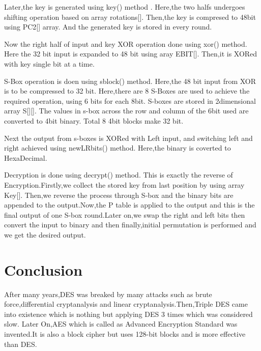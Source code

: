 \documentclass[11pt]{article}
\begin{document}
Later,the key is generated using key() method .
Here,the two halfs undergoes shifting operation based on array rotations[].
Then,the key is compresed to 48bit using PC2[] array.
And the generated key is stored in every round.

Now the right half of input and key XOR operation done using xor() method.
Here the 32 bit input is expanded to 48 bit using aray EBIT[].
Then,it is XORed with key single bit at a time.

S-Box operation is doen using sblock() method.
Here,the 48 bit input from XOR is to be compressed to 32 bit.
Here,there are 8 S-Boxes are used to achieve the required operation, using 6 bits for each 8bit.
S-boxes are stored in 2dimensional array S[][].
The values in s-box across the row and column of the 6bit used are converted to 4bit binary.
Total 8 4bit blocks make 32 bit.

Next the output from s-boxes is XORed with Left input, and switching left and right achieved using newLRbits() method.
Here,the binary is coverted to HexaDecimal.

Decryption is done using decrypt() method.
This is exactly the reverse of Encryption.Firstly,we collect the stored key from last position by using array Key[].
Then,we reverse the process through S-box and the binary bits are appended to the output.Now,the P table is applied to
the output and this is the final output of one S-box round.Later on,we swap the right and left bits then 
convert the input to binary and then finally,initial permutation is performed and we get the desired output.




   

\section{Conclusion}
 \quad\quad After many years,DES was breaked by many attacks such as brute force,differential cryptanalysis and linear cryptanalysis.Then,Triple DES came into existence which 
is nothing but applying DES 3 times which was considered slow.
Later On,AES which is called as Advanced Encryption Standard was invented.It is also a block cipher but uses 128-bit blocks and is more effective than DES.
  

\end{document}
